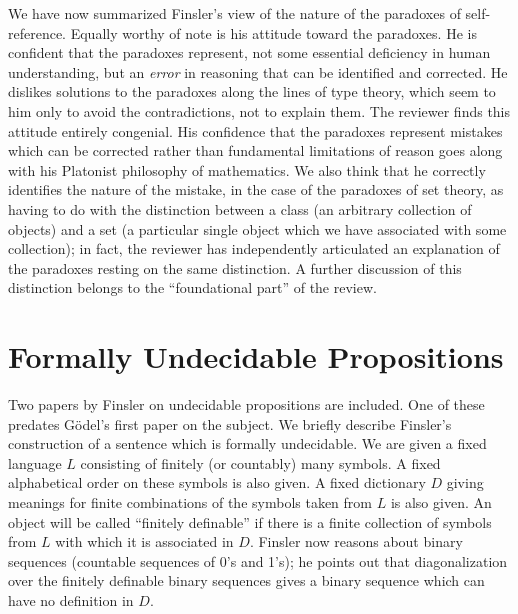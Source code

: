 We have now summarized Finsler's view of the nature of the paradoxes
of self-reference.  Equally worthy of note is his attitude toward the
paradoxes.  He is confident that the paradoxes represent, not some
essential deficiency in human understanding, but an {\em error\/} in
reasoning that can be identified and corrected.  He dislikes solutions
to the paradoxes along the lines of type theory, which seem to him
only to avoid the contradictions, not to explain them.  The reviewer
finds this attitude entirely congenial.  His confidence that the
paradoxes represent mistakes which can be corrected rather than
fundamental limitations of reason goes along with his Platonist
philosophy of mathematics.  We also think that he correctly identifies
the nature of the mistake, in the case of the paradoxes of set theory,
as having to do with the distinction between a class (an arbitrary
collection of objects) and a set (a particular single object which we
have associated with some collection); in fact, the reviewer has
independently articulated an explanation of the paradoxes resting on
the same distinction.  A further discussion of this distinction
belongs to the ``foundational part'' of the review.

\section{Formally Undecidable Propositions}

Two papers by Finsler on undecidable propositions are included.  One
of these predates G\"odel's first paper on the subject.  We briefly
describe Finsler's construction of a sentence which is formally
undecidable.  We are given a fixed language $L$ consisting of finitely
(or countably) many symbols.  A fixed alphabetical order on these
symbols is also given.  A fixed dictionary $D$ giving meanings for
finite combinations of the symbols taken from $L$ is also given.  An
object will be called ``finitely definable'' if there is a finite
collection of symbols from $L$ with which it is associated in $D$.
Finsler now reasons about binary sequences (countable sequences of 0's
and 1's); he points out that diagonalization over the finitely
definable binary sequences gives a binary sequence which can have no
definition in $D$.

